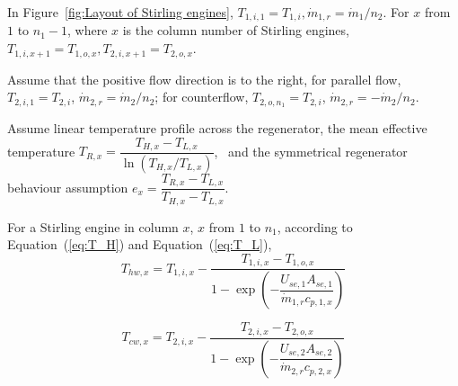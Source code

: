 In Figure~\ref{fig:Layout of Stirling engines}, $T_{1,i,1}=T_{1,i},\dot{m}_{1,r}=\dot{m}_{1}/n_{2}$. For $x$ from $1$ to $n_1-1$, where $x$ is the column number of Stirling engines, $T_{1,i,x+1}=T_{1,o,x},T_{2,i,x+1}=T_{2,o,x}$.

Assume that the positive flow direction is to the right, for parallel flow, $T_{2,i,1}=T_{2,i}$, $\dot{m}_{2,r}=\dot{m}_{2}/n_{2}$; for counterflow, $T_{2,o,n_1}=T_{2,i}$, $\dot{m}_{2,r}=-\dot{m}_{2}/n_{2}$.


%

Assume linear temperature profile across the regenerator, the mean effective temperature $T_{R,x}=\dfrac{T_{H,x}-T_{L,x}}{\ln(T_{H,x}/T_{L,x})}$,~\cite{Der2007,Cavazzuti2012} and the symmetrical regenerator behaviour assumption $e_{x}=\dfrac{T_{R,x}-T_{L,x}}{T_{H,x}-T_{L,x}}$.~\cite{Formosa2010,Juhasz2010} 

For a Stirling engine in column $x$, $x$ from $1$ to $n_1$, according to Equation~(\ref{eq:T_H}) and Equation~(\ref{eq:T_L}),
\begin{equation}
	T_{hw,x}=T_{1,i,x}-\dfrac{T_{1,i,x}-T_{1,o,x}}{1-\exp(-\dfrac{U_{se,1}A_{se,1}}{\dot{m}_{1,r}c_{p,1,x}})}\label{eq:T_H_x}
\end{equation}


\begin{equation}
	T_{cw,x}=T_{2,i,x}-\dfrac{T_{2,i,x}-T_{2,o,x}}{1-\exp(-\dfrac{U_{se,2}A_{se,2}}{\dot{m}_{2,r}c_{p,2,x}})}\label{eq:T_L_x}
\end{equation}

